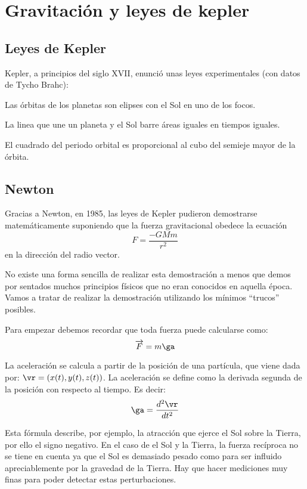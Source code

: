 \chapter{Gravitación y leyes de kepler}
\section{Leyes de Kepler}

Kepler, a principios del siglo XVII, enunció unas leyes experimentales (con datos de Tycho Brahc):

\begin{lemma}
	Las órbitas de los planetas son elipses con el Sol en uno de los focos.
\end{lemma}

\begin{lemma}
	La linea que une un planeta y el Sol barre áreas iguales en tiempos iguales.
\end{lemma}

\begin{lemma}
	El cuadrado del periodo orbital es proporcional al cubo del semieje mayor de la órbita.
\end{lemma}

\section{Newton}

Gracias a Newton, en 1985, las leyes de Kepler pudieron demostrarse matemáticamente suponiendo que la fuerza gravitacional obedece la ecuación
\[ F = \frac{-GMm}{r^2} \]
en la dirección del radio vector.

No existe una forma sencilla de realizar esta demostración a menos que demos por sentados muchos principios físicos que no eran conocidos en aquella época. Vamos a tratar de realizar la demostración utilizando los mínimos ``trucos'' posibles.

Para empezar debemos recordar que toda fuerza puede calcularse como:
$$ \overrightarrow{F} = m\ga$$

La aceleración se calcula a partir de la posición de una partícula, que viene dada por: $\vr = (x(t), y(t), z(t))$. La aceleración se define como la derivada segunda de la posición con respecto al tiempo. Es decir:
\[ \ga = \frac{d^2\vr}{d t^2} \]

Esta fórmula describe, por ejemplo, la atracción que ejerce el Sol sobre la Tierra, por ello el signo negativo. En el caso de el Sol y la Tierra, la fuerza recíproca no se tiene en cuenta ya que el Sol es demasiado pesado como para ser influido apreciablemente por la gravedad de la Tierra. Hay que hacer mediciones muy finas para poder detectar estas perturbaciones.

